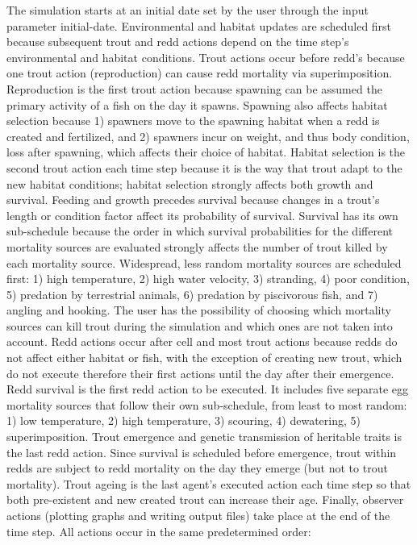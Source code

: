 {
  \color{gddarkredb}
  The simulation starts at an initial date set by the user through the input parameter initial-date. Environmental and habitat updates are scheduled first because subsequent trout and redd actions depend on the time step's environmental and habitat conditions. Trout actions occur before redd's because one trout action (reproduction) can cause redd mortality via superimposition. Reproduction is the first trout action because spawning can be assumed the primary activity of a fish on the day it spawns. Spawning also affects habitat selection because 1) spawners move to the spawning habitat when a redd is created and fertilized, and 2) spawners incur on weight, and thus body condition, loss after spawning, which affects their choice of habitat. Habitat selection is the second trout action each time step because it is the way that trout adapt to the new habitat conditions; habitat selection strongly affects both growth and survival. Feeding and growth precedes survival because changes in a trout's length or condition factor affect its probability of survival. Survival has its own sub-schedule because the order in which survival probabilities for the different mortality sources are evaluated strongly affects the number of trout killed by each mortality source. Widespread, less random mortality sources are scheduled first: 1) high temperature, 2) high water velocity, 3) stranding, 4) poor condition, 5) predation by terrestrial animals, 6) predation by piscivorous fish, and 7) angling and hooking. The user has the possibility of choosing which mortality sources can kill trout during the simulation and which ones are not taken into account. Redd actions occur after cell and most trout actions because redds do not affect either habitat or fish, with the exception of creating new trout, which do not execute therefore their first actions until the day after their emergence. Redd survival is the first redd action to be executed. It includes five separate egg mortality sources that follow their own sub-schedule, from least to most random: 1) low temperature, 2) high temperature, 3) scouring, 4) dewatering, 5) superimposition. Trout emergence and genetic transmission of heritable traits is the last redd action. Since survival is scheduled before emergence, trout within redds are subject to redd mortality on the day they emerge (but not to trout mortality). Trout ageing is the last agent's executed action each time step so that both pre-existent and new created trout can increase their age. Finally, observer actions (plotting graphs and writing output files) take place at the end of the time step. All actions occur in the same predetermined order:

}
